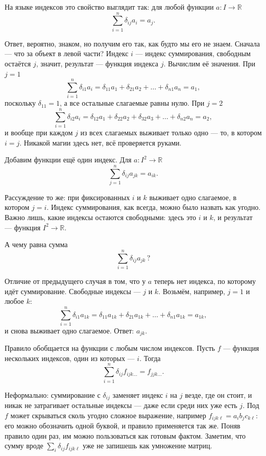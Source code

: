 \documentclass[11pt,a4paper]{article}
\begin{document}
На языке индексов это свойство выглядит так: для любой функции $a\colon I \to \mathbb{R}$
\[
\sum_{i=1}^{n} \delta_{ij} a_i = a_j.
\]

Ответ, вероятно, знаком, но получим его так, как будто мы его не знаем. Сначала — что за объект в левой части? Индекс $i$ — индекс суммирования, свободным остаётся $j$, значит, результат — функция индекса $j$. Вычислим её значения. При $j = 1$
\[
\sum_{i=1}^{n} \delta_{i1} a_i = \delta_{11} a_1 + \delta_{21} a_2 + \dots + \delta_{n1} a_n = a_1,
\]
поскольку $\delta_{11} = 1$, а все остальные слагаемые равны нулю. При $j = 2$
\[
\sum_{i=1}^{n} \delta_{i2} a_i = \delta_{12} a_1 + \delta_{22} a_2 + \delta_{32} a_3 + \dots + \delta_{n2} a_n = a_2,
\]
и вообще при каждом $j$ из всех слагаемых выживает только одно — то, в котором $i = j$. Никакой магии здесь нет, всё проверяется руками.

Добавим функции ещё один индекс. Для $a\colon I^2 \to \mathbb{R}$
\[
\sum_{j=1}^{n} \delta_{ij} a_{jk} = a_{ik}.
\]

Рассуждение то же: при фиксированных $i$ и $k$ выживает одно слагаемое, в котором $j = i$. Индекс суммирования, как всегда, можно было назвать как угодно. Важно лишь, какие индексы остаются свободными: здесь это $i$ и $k$, и результат — функция $I^2 \to \mathbb{R}$.

А чему равна сумма
\[
\sum_{i=1}^{n} \delta_{ij} a_{jk}\,?
\]

Отличие от предыдущего случая в том, что у $a$ теперь нет индекса, по которому идёт суммирование. Свободные индексы — $j$ и $k$. Возьмём, например, $j = 1$ и любое $k$:
\[
\sum_{i=1}^{n} \delta_{i1} a_{1k} = \delta_{11} a_{1k} + \delta_{21} a_{1k} + \dots + \delta_{n1} a_{1k} = a_{1k},
\]
и снова выживает одно слагаемое. Ответ: $a_{jk}$.

Правило обобщается на функции с любым числом индексов. Пусть $f$ — функция нескольких индексов, один из которых — $i$. Тогда
\[
\sum_{i=1}^{n} \delta_{ij} f_{ijk\dots} = f_{jjk\dots}.
\]

Неформально: суммирование с $\delta_{ij}$ заменяет индекс $i$ на $j$ везде, где он стоит, и никак не затрагивает остальные индексы — даже если среди них уже есть $j$. Под $f$ может скрываться сколь угодно сложное выражение, например $f_{ijk\ell} = a_i b_j c_{k\ell}$: его можно обозначить одной буквой, и правило применяется так же. Поняв правило один раз, им можно пользоваться как готовым фактом. Заметим, что сумму вроде $\sum_i \delta_{ij} f_{ijk\ell}$ уже не запишешь как умножение матриц.
\end{document}
